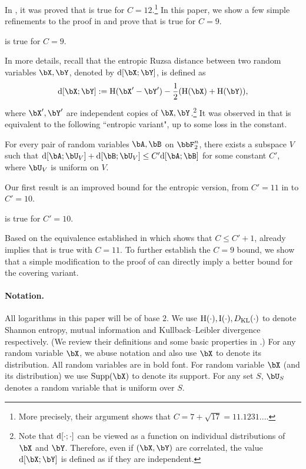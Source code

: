 \documentclass{article}
\DeclarePairedDelimiter{\paren}{(}{)}
\DeclarePairedDelimiter{\sqpar}{[}{]}
\newcommand{\ent}{\mathrm{H}\paren}
\newcommand{\info}{\mathrm{I}\paren}
\newcommand{\Ruz}{\mathrm{d}\sqpar}
\begin{document}
In \cite{GGMT23}, it was proved that  is true for $C=12$.\footnote{More precisely, their argument shows that $C=7+\sqrt{17}=11.1231...$.} In this paper, we show a few simple refinements to the proof in \cite{GGMT23} and prove that  is true for $C=9$.
\noindent
\begin{theorem}\label{theorem:Marton}
 is true for $C=9$.
\end{theorem}

In more details, recall that the entropic Ruzsa distance between two random variables $\bX,\bY$, denoted by $\Ruz{\bX;\bY}$, is defined as $$\Ruz{\bX;\bY}:=\ent{\bX'-\bY'}-\frac{1}{2}(\ent{\bX}+\ent{\bY}),$$
where $\bX',\bY'$ are independent copies of $\bX,\bY$.\footnote{Note that $\Ruz{\cdot;\cdot}$ can be viewed as a function on individual distributions of $\bX$ and $\bY$. Therefore, even if $(\bX,\bY)$ are correlated, the value $\Ruz{\bX;\bY}$ is defined as if they are independent.} It was observed in \cite{GMT23} that  is equivalent to the following ``entropic variant", up to some loss in the constant.
\begin{conjecture}\label{conj:Marton-entropic}
For every pair of random variables $\bA,\bB$ on $\bbF_2^n$, there exists a subspace $V$ such that $\Ruz{\bA;\bU_V}+\Ruz{\bB;\bU_V}\le C' \Ruz{\bA;\bB}$ for some constant $C'$, where $\bU_V$ is uniform on $V$.
\end{conjecture}
\noindent
Our first result is an improved bound for the entropic version, from $C'=11$ in \cite{GGMT23} to $C'=10$.
\begin{theorem}\label{theorem:Marton-entropic}
 is true for $C'=10$.
\end{theorem}
\noindent
Based on the equivalence established in \cite{GMT23} which shows that $C\le C'+1$,  already implies that  is true with $C=11$. To further establish the $C=9$ bound, we show that a simple modification to the proof of  can directly imply a better bound for the covering variant.


\paragraph{Notation.} All logarithms in this paper will be of base $2$. We use $\ent{\cdot},\info{\cdot},D_{\mathrm{KL}}(\cdot)$ to denote Shannon entropy, mutual information and Kullback–Leibler divergence respectively. (We review their definitions and some basic properties in .) For any random variable $\bX$, we abuse notation and also use $\bX$ to denote its distribution. All random variables are in bold font. For random variable $\bX$ (and its distribution) we use $\Supp(\bX)$ to denote its support. For any set $S$, $\bU_S$ denotes a random variable that is uniform over $S$. 
\end{document}
